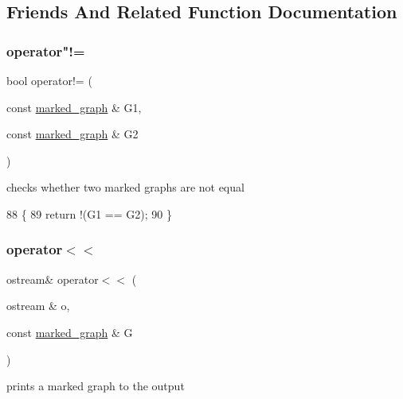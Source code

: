 \subsection{Friends And Related Function Documentation}
\mbox{\label{classmarked__graph_a52ab641f19231908b18f8661bad17493}} 
\subsubsection{\texorpdfstring{operator"!=}{operator!=}}
{\footnotesize\ttfamily bool operator!= (\begin{DoxyParamCaption}\item[{const \hyperlink{classmarked__graph}{marked\+\_\+graph} \&}]{G1,  }\item[{const \hyperlink{classmarked__graph}{marked\+\_\+graph} \&}]{G2 }\end{DoxyParamCaption})\hspace{0.3cm}{\ttfamily [friend]}}



checks whether two marked graphs are not equal 


\begin{DoxyCode}
88 \{
89   \textcolor{keywordflow}{return} !(G1 == G2);
90 \}
\end{DoxyCode}
\mbox{\label{classmarked__graph_a4f98d2df29f50f6da1365a14fd80d764}} 
\subsubsection{\texorpdfstring{operator$<$$<$}{operator<<}}
{\footnotesize\ttfamily ostream\& operator$<$$<$ (\begin{DoxyParamCaption}\item[{ostream \&}]{o,  }\item[{const \hyperlink{classmarked__graph}{marked\+\_\+graph} \&}]{G }\end{DoxyParamCaption})\hspace{0.3cm}{\ttfamily [friend]}}



prints a marked graph to the output 


